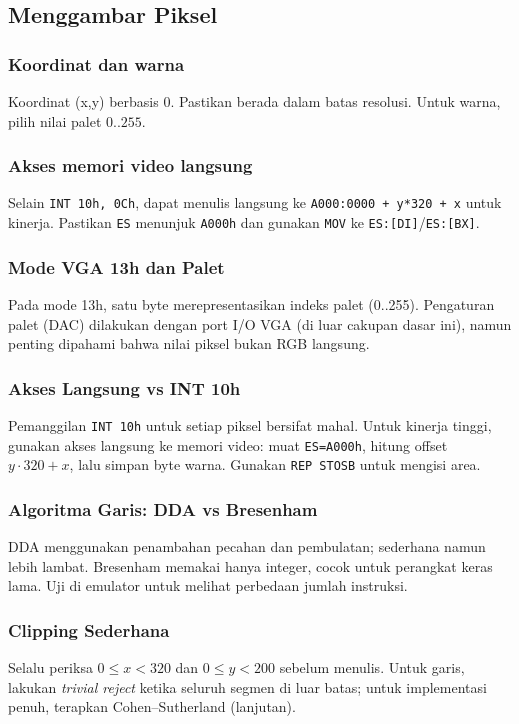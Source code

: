 \subsection{Menggambar Piksel}
\subsubsection{Koordinat dan warna}
Koordinat (x,y) berbasis 0. Pastikan berada dalam batas resolusi. Untuk warna, pilih nilai palet \(0..255\).

\subsubsection{Akses memori video langsung}
Selain \texttt{INT 10h, 0Ch}, dapat menulis langsung ke \texttt{A000:0000 + y*320 + x} untuk kinerja. Pastikan \texttt{ES} menunjuk \texttt{A000h} dan gunakan \texttt{MOV} ke \texttt{ES:[DI]}/\texttt{ES:[BX]}.

\subsubsection{Mode VGA 13h dan Palet}
Pada mode 13h, satu byte merepresentasikan indeks palet (0..255). Pengaturan palet (DAC) dilakukan dengan port I/O VGA (di luar cakupan dasar ini), namun penting dipahami bahwa nilai piksel bukan RGB langsung.

\subsubsection{Akses Langsung vs INT 10h}
Pemanggilan \texttt{INT 10h} untuk setiap piksel bersifat mahal. Untuk kinerja tinggi, gunakan akses langsung ke memori video: muat \texttt{ES=A000h}, hitung offset \(y\cdot 320 + x\), lalu simpan byte warna. Gunakan \texttt{REP STOSB} untuk mengisi area.

\subsubsection{Algoritma Garis: DDA vs Bresenham}
DDA menggunakan penambahan pecahan dan pembulatan; sederhana namun lebih lambat. Bresenham memakai hanya integer, cocok untuk perangkat keras lama. Uji di emulator untuk melihat perbedaan jumlah instruksi.

\subsubsection{Clipping Sederhana}
Selalu periksa \(0 \le x < 320\) dan \(0 \le y < 200\) sebelum menulis. Untuk garis, lakukan \textit{trivial reject} ketika seluruh segmen di luar batas; untuk implementasi penuh, terapkan Cohen–Sutherland (lanjutan).

